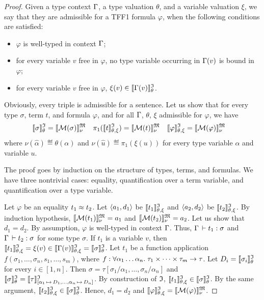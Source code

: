 \begin{proof}
Given a type context $\mathrm{\Gamma}$, a type valuation $\theta$,
and a variable valuation $\xi$, we say that they are admissible
for a TFF1 formula $\varphi$, when the following conditions are satisfied:
\begin{itemize}
\item $\varphi$ is well-typed in context $\mathrm{\Gamma}$;
\item for every variable $v$ free in $\varphi$, no type variable
occurring in $\mathrm{\Gamma}(v)$ is bound in $\varphi$;
\item for every variable $v$ free in $\varphi$, $\xi(v) \in \llbracket\mathrm{\Gamma}(v)\rrbracket^{\mathfrak{I}}_{\theta}$.
\end{itemize}
Obviously, every triple is admissible for a sentence.
Let us show that for every type $\sigma$, term $t$, and formula $\varphi$,
and for all $\mathrm{\Gamma}$, $\theta$, $\xi$ admissible for $\varphi$, we have
\begin{align*}
\llbracket\sigma\rrbracket^{\mathfrak{I}}_{\theta} &= \llbracket \mathcal{M}(\sigma) \rrbracket^{\mathfrak{M}}_{\nu} &
\pi_1(\llbracket t\rrbracket^{\mathfrak{I}}_{\theta,\xi}) &= \llbracket \mathcal{M}(t) \rrbracket^{\mathfrak{M}}_{\nu} &
\llbracket\varphi\rrbracket^{\mathfrak{I}}_{\theta,\xi} &= \llbracket \mathcal{M}(\varphi) \rrbracket^{\mathfrak{M}}_{\nu}
\end{align*}
where $\nu(\hat{\alpha}) \eqdef \theta(\alpha)$ and
$\nu(\hat{u}) \eqdef \pi_1(\xi(u))$
for every type variable $\alpha$ and variable $u$.

The proof goes by induction on the structure of types, terms, and formulas.
We have three nontrivial cases: equality, quantification over a term
variable, and quantification over a type variable.

Let $\varphi$ be an equality $t_1 \approx t_2$.
Let $\langle a_1, d_1 \rangle$ be $\llbracket t_1\rrbracket^{\mathfrak{I}}_{\theta,\xi}$ and $\langle a_2, d_2 \rangle$ be $\llbracket t_2\rrbracket^{\mathfrak{I}}_{\theta,\xi}$.
By induction hypothesis, $\llbracket \mathcal{M}(t_1) \rrbracket^{\mathfrak{M}}_{\nu} = a_1$ and
$\llbracket \mathcal{M}(t_2) \rrbracket^{\mathfrak{M}}_{\nu} = a_2$. Let us show that $d_1 = d_2$.
By assumption, $\varphi$ is well-typed in context $\mathrm{\Gamma}$.
Thus, $\mathrm{\Gamma}\,\vdash t_1 \mathrel{:} \sigma$ and $\mathrm{\Gamma}\,\vdash t_2 \mathrel{:} \sigma$
for some type $\sigma$.
If $t_1$ is a variable $v$, then
$\llbracket t_1\rrbracket^{\mathfrak{I}}_{\theta,\xi} = \xi(v) \in \llbracket\mathrm{\Gamma}(v)\rrbracket^{\mathfrak{I}}_{\theta,\xi} = \llbracket\sigma\rrbracket^{\mathfrak{I}}_{\theta}$.
Let $t_1$ be a function application $f(\sigma_1,\dots,\sigma_n,s_1,\dots,s_m)$,
where $f \mathrel{:}
\forall \alpha_1\dots\alpha_n .\; \tau_1 \times \dots \times \tau_m \to \tau$.
Let $D_i = \llbracket\sigma_i\rrbracket^{\mathfrak{I}}_{\theta}$ for every $i \in [1,n]$.
Then $\sigma = \tau[\sigma_1/\alpha_1,\dots,\sigma_n/\alpha_n]$ and
$\llbracket\sigma\rrbracket^{\mathfrak{I}}_{\theta} = \llbracket \tau \rrbracket^{\mathfrak{I}}_{[\alpha_1 \,\mapsto\, D_1,\dots,
\alpha_n \,\mapsto\, D_n]}$.
By construction of $\mathfrak{I}$, $\llbracket t_1\rrbracket^{\mathfrak{I}}_{\theta,\xi} \in \llbracket\sigma\rrbracket^{\mathfrak{I}}_{\theta}$.
By the same argument, $\llbracket t_2\rrbracket^{\mathfrak{I}}_{\theta,\xi} \in \llbracket\sigma\rrbracket^{\mathfrak{I}}_{\theta}$.
Hence, $d_1 = d_2$ and $\llbracket\varphi\rrbracket^{\mathfrak{I}}_{\theta,\xi} = \llbracket \mathcal{M}(\varphi) \rrbracket^{\mathfrak{M}}_{\nu}$.


\end{proof}
